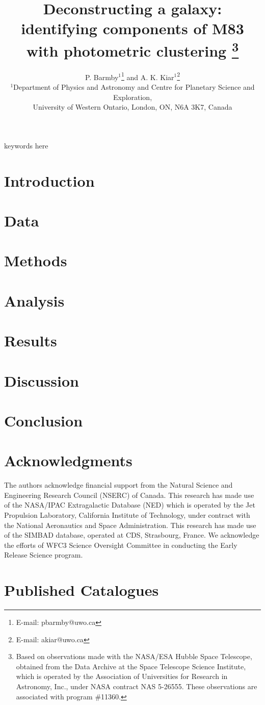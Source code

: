 \documentclass[useAMS,usenatbib]{mn2e}
\title[Deconstructing M83]{Deconstructing a galaxy: identifying components of M83 with photometric clustering%
\footnote{  
Based on observations made with the NASA/ESA Hubble Space Telescope, obtained from the Data Archive at the Space Telescope Science Institute, which is operated by the Association of Universities for Research in Astronomy, Inc., under NASA contract NAS 5-26555. These observations are associated with program \#11360.
}
}
\author[Kiar \& Barmby]
{
P. Barmby$^{1}$\thanks{E-mail: pbarmby@uwo.ca} and 
A. K. Kiar$^{1}$\thanks{E-mail: akiar@uwo.ca}\\
$^{1}$Department of Physics and Astronomy and Centre for Planetary Science and Exploration,\\
University of Western Ontario, London, ON, N6A 3K7, Canada\\
}
\begin{document}
\date{}


\maketitle
\label{firstpage}

\begin{abstract}

\end{abstract}

\begin{keywords}
keywords here
\end{keywords}

\section{Introduction}

\section{Data}

\section{Methods}

\section{Analysis}

\section{Results}

\section{Discussion}

\section{Conclusion}



\section*{Acknowledgments}

The authors acknowledge financial support from the Natural Science and Engineering Research Council (NSERC) of Canada.
This research has made use of the NASA/IPAC Extragalactic Database (NED) which is operated by the Jet Propulsion Laboratory,
California Institute of Technology, under contract with the National Aeronautics and Space Administration. 
This research has made use of the SIMBAD database, operated at CDS, Strasbourg, France.
We acknowledge the efforts of WFC3 Science Oversight Committee in conducting the Early Release Science program.

\appendix
\section{Published Catalogues}



{}

\bsp

\label{lastpage}
\end{document}
